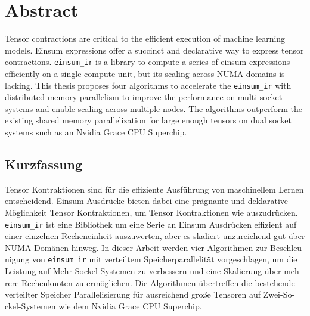 \thispagestyle{empty} 

\section*{Abstract}

Tensor contractions are critical to the efficient execution of machine learning models.
Einsum expressions offer a succinct and declarative way to express tensor contractions.
\texttt{einsum\_ir}  is a library to compute a series of einsum expressions  efficiently on a single compute unit, but its scaling across NUMA domains is lacking.
This thesis proposes four algorithms to accelerate the \texttt{einsum\_ir} with distributed memory parallelism to improve the performance on multi socket systems and enable scaling across multiple nodes.
The algorithms outperform the existing shared memory parallelization for large enough tensors on dual socket systems such as an Nvidia Grace CPU Superchip.

\thispagestyle{empty} 

\begin{otherlanguage}{ngerman}
\section*{Kurzfassung}

Tensor Kontraktionen sind für die effiziente Ausführung von maschinellem Lernen entscheidend.
Einsum Ausdrücke bieten dabei eine prägnante und deklarative Möglichkeit Tensor Kontraktionen, um Tensor Kontraktionen wie auszudrücken.
\texttt{einsum\_ir} ist eine Bibliothek um eine Serie an Einsum Ausdrücken effizient auf einer einzelnen Recheneinheit auszuwerten, aber es skaliert unzureichend gut über NUMA-Domänen hinweg.
In dieser Arbeit werden vier Algorithmen zur Beschleunigung von \texttt{einsum\_ir} mit verteiltem Speicherparallelität vorgeschlagen, um die Leistung auf Mehr-Sockel-Systemen zu verbessern und eine Skalierung über mehrere Rechenknoten zu ermöglichen.
Die Algorithmen übertreffen die bestehende verteilter Speicher Parallelisierung für ausreichend große Tensoren auf Zwei-Sockel-Systemen wie dem Nvidia Grace CPU Superchip.
\end{otherlanguage}
